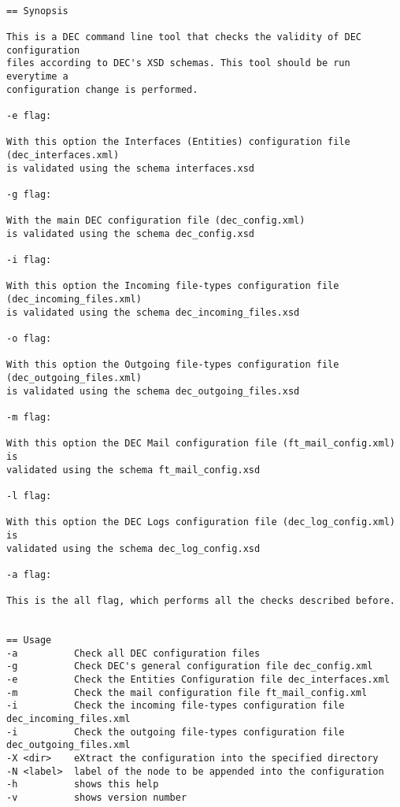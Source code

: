\documentclass[dec_sum_main.tex]{subfiles}
\begin{document}
\begin{verbatim}

== Synopsis
	
This is a DEC command line tool that checks the validity of DEC configuration
files according to DEC's XSD schemas. This tool should be run everytime a 
configuration change is performed.

-e flag:

With this option the Interfaces (Entities) configuration file (dec_interfaces.xml)
is validated using the schema interfaces.xsd

-g flag:

With the main DEC configuration file (dec_config.xml)
is validated using the schema dec_config.xsd

-i flag:

With this option the Incoming file-types configuration file (dec_incoming_files.xml)
is validated using the schema dec_incoming_files.xsd

-o flag:

With this option the Outgoing file-types configuration file (dec_outgoing_files.xml)
is validated using the schema dec_outgoing_files.xsd

-m flag:

With this option the DEC Mail configuration file (ft_mail_config.xml) is
validated using the schema ft_mail_config.xsd

-l flag:

With this option the DEC Logs configuration file (dec_log_config.xml) is
validated using the schema dec_log_config.xsd

-a flag:

This is the all flag, which performs all the checks described before.


== Usage
-a          Check all DEC configuration files
-g          Check DEC's general configuration file dec_config.xml
-e          Check the Entities Configuration file dec_interfaces.xml
-m          Check the mail configuration file ft_mail_config.xml
-i          Check the incoming file-types configuration file dec_incoming_files.xml
-i          Check the outgoing file-types configuration file dec_outgoing_files.xml
-X <dir>    eXtract the configuration into the specified directory
-N <label>  label of the node to be appended into the configuration
-h          shows this help
-v          shows version number
	
\end{verbatim}


\label{decCheckConfig}
\end{document}
